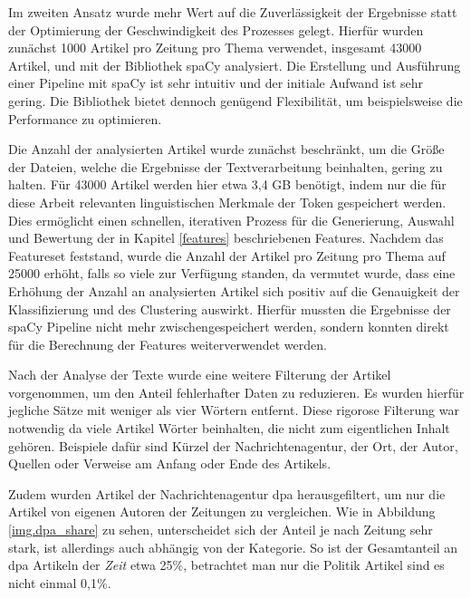 Im zweiten Ansatz wurde mehr Wert auf die Zuverlässigkeit der Ergebnisse statt der Optimierung der Geschwindigkeit des Prozesses gelegt. Hierfür wurden zunächst 1000 Artikel pro Zeitung pro Thema verwendet, insgesamt 43000 Artikel, und mit der Bibliothek spaCy analysiert. Die Erstellung und Ausführung einer Pipeline mit spaCy ist sehr intuitiv und der initiale Aufwand ist sehr gering. Die Bibliothek bietet dennoch genügend Flexibilität, um beispielsweise die Performance zu optimieren.


Die Anzahl der analysierten Artikel wurde zunächst beschränkt, um die Größe der Dateien, welche die Ergebnisse der Textverarbeitung beinhalten, gering zu halten. Für 43000 Artikel werden hier etwa 3,4 GB benötigt, indem nur die für diese Arbeit relevanten linguistischen Merkmale der Token gespeichert werden. Dies ermöglicht einen schnellen, iterativen Prozess für die Generierung, Auswahl und Bewertung der in Kapitel \ref{features} beschriebenen Features. Nachdem das Featureset feststand, wurde die Anzahl der Artikel pro Zeitung pro Thema auf 25000 erhöht, falls so viele zur Verfügung standen, da vermutet wurde, dass eine Erhöhung der Anzahl an analysierten Artikel sich positiv auf die Genauigkeit der Klassifizierung und des Clustering auswirkt. Hierfür mussten die Ergebnisse der spaCy Pipeline nicht mehr zwischengespeichert werden, sondern konnten direkt für die Berechnung der Features weiterverwendet werden.

Nach der Analyse der Texte wurde eine weitere Filterung der Artikel vorgenommen, um den Anteil fehlerhafter Daten zu reduzieren. Es wurden hierfür jegliche Sätze mit weniger als vier Wörtern entfernt. Diese rigorose Filterung war notwendig da viele Artikel Wörter beinhalten, die nicht zum eigentlichen Inhalt gehören. Beispiele dafür sind Kürzel der Nachrichtenagentur, der Ort, der Autor, Quellen oder Verweise am Anfang oder Ende des Artikels.


Zudem wurden Artikel der Nachrichtenagentur dpa herausgefiltert, um nur die Artikel von eigenen Autoren der Zeitungen zu vergleichen. Wie in Abbildung \ref{img.dpa_share} zu sehen, unterscheidet sich der Anteil je nach Zeitung sehr stark, ist allerdings auch abhängig von der Kategorie. So ist der Gesamtanteil an dpa Artikeln der \emph{Zeit} etwa 25\%, betrachtet man nur die Politik Artikel sind es nicht einmal 0,1\%.

